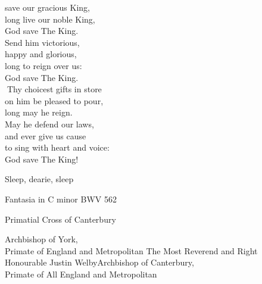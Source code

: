 







\begin{center}
	

 save our gracious King,\\
long live our noble King,\\
God save The King.\\
Send him victorious,\\
happy and glorious,\\
long to reign over us:\\
God save The King.\\

Thy choicest gifts in store\\
on him be pleased to pour,\\
long may he reign.\\
May he defend our laws,\\
and ever give us cause\\
to sing with heart and voice:\\
God save The King!\\

\end{center}




Sleep, dearie, sleep\hfill{}


Fantasia in C minor BWV 562\hfill{}





{Primatial Cross of Canterbury}{}

{Archbishop of York,\\
Primate of England and Metropolitan}
{The Most Reverend and Right\\
Honourable Justin Welby}{Archbishop of Canterbury,\\
Primate of All England and Metropolitan}

